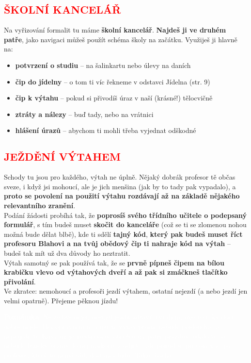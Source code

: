 \documentclass{article}
\newcommand{\podnadpis}[1]{
  \subsection*{\textcolor{red}{#1}}
}
\begin{document}
\newpage

\podnadpis{ŠKOLNÍ KANCELÁŘ}

Na vyřizování formalit tu máme \textbf{školní kancelář}. \textbf{Najdeš ji ve druhém patře}, jako
navigaci můžeš použít schéma školy na začátku.
Využiješ ji hlavně na:
\begin{itemize}[leftmargin=10pt]
  \item \textbf{potvrzení o studiu} -- na šalinkartu nebo úlevy na daních
  \item \textbf{čip do jídelny} -- o tom ti víc řekneme v odstavci Jídelna (str. 9)
  \item \textbf{čip k výtahu} -- pokud si přivodíš úraz v naší (krásné!) tělocvičně
  \item \textbf{ztráty a nálezy} -- buď tady, nebo na vrátnici
  \item \textbf{hlášení úrazů} -- abychom ti mohli třeba vyjednat odškodné
\end{itemize}

\podnadpis{JEŽDĚNÍ VÝTAHEM}
Schody tu jsou pro každého, výtah ne úplně. Nějaký dobrák profesor tě občas sveze, i když jsi mohoucí, ale je jich menšina (jak by to tady pak vypadalo), a \textbf{proto se povolení na použití výtahu rozdávají až na základě nějakého relevantního zranění}. \\
Podání žádosti probíhá tak, že \textbf{poprosíš svého třídního učitele o podepsaný formulář}, s tím budeš muset \textbf{skočit do kanceláře} (což se ti se zlomenou nohou možná bude dělat blbě), kde ti sdělí \textbf{tajný kód}, \textbf{který pak budeš muset říct profesoru Blahovi a na tvůj
obědový čip ti nahraje kód na výtah} -- budeš tak mít už dva důvody ho neztratit. \\
Výtah samotný se pak používá tak, že se \textbf{prvně pípneš čipem na bílou krabičku
vlevo od výtahových dveří a až pak si zmáčkneš tlačítko přivolání}. \\
Ve zkratce: nemohoucí a profesoři jezdí výtahem, ostatní nejezdí (a nebo jezdí jen
velmi opatrně). Přejeme pěknou jízdu!

\begin{redbox}
  \textcolor{white}{\footnotesize \textbf{Poznámka.} Ne že bys nejen nesměl jezdit zdravý výtahem, ono to taky dost dobře nejde. Bez oprávnění na čipu tě výtah prostě nebude poslouchat a nepřijede ti. Když už je mysteriózně otevřen na patře prázdný, nikdo ti asi nebude fyzicky bránit do něj naskočit a odjet – ale pokud tě při tom načapá profesor, který to nemá rád, dostaneš bídu. Takže bacha.}
\end{redbox}
\end{document}
